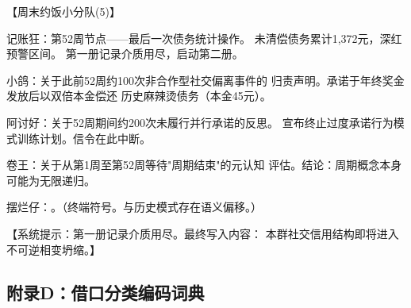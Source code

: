 \documentclass[journal]{IEEEtran}
\begin{document}
\begin{chatbox}
【周末约饭小分队(5)】

记账狂：第52周节点——最后一次债务统计操作。
未清偿债务累计1,372元，深红预警区间。
第一册记录介质用尽，启动第二册。

小鸽：关于此前52周约100次非合作型社交偏离事件的
归责声明。承诺于年终奖金发放后以双倍本金偿还
历史麻辣烫债务（本金45元）。

阿讨好：关于52周期间约200次未履行并行承诺的反思。
宣布终止过度承诺行为模式训练计划。信令在此中断。

卷王：关于从第1周至第52周等待"周期结束"的元认知
评估。结论：周期概念本身可能为无限递归。

摆烂仔：。（终端符号。与历史模式存在语义偏移。）

【系统提示：第一册记录介质用尽。最终写入内容：
本群社交信用结构即将进入不可逆相变坍缩。】
\end{chatbox}

\subsection*{附录D：借口分类编码词典}
\end{document}
